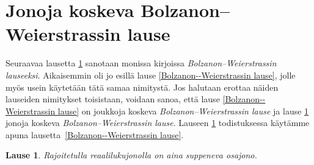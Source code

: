 \documentclass[a4paper,12pt,leqno,oneside]{report} %
\theoremstyle{plain}
\newtheorem{lause}{Lause}[chapter]
\theoremstyle{definition}
\theoremstyle{remark}
\numberwithin{equation}{chapter}
\begin{document}
\section{Jonoja koskeva Bolzanon--Weierstrassin lause}%
\label{sec: Jonoja koskeva BW:n lause}

Seuraavaa lausetta \ref{jonoja koskeva BW:n lause} sanotaan monissa kirjoissa \emph{Bolzanon--Weierstrassin lau\-seeksi}. Aikaisemmin oli jo esillä lause \ref{Bolzanon--Weierstrassin lause}, jolle myös usein käytetään tätä samaa nimitystä. Jos halutaan erottaa näiden lauseiden nimitykset toisistaan, voidaan sanoa, että lause \ref{Bolzanon--Weierstrassin lause} on joukkoja koskeva \emph{Bolzanon--Weierstras\-sin lause} ja lause \ref{jonoja koskeva BW:n lause} jonoja koskeva \emph{Bolzanon--Weierstrassin lause}. Lauseen \ref{jonoja koskeva BW:n lause} todistuksessa käytämme apuna lausetta~\ref{Bolzanon--Weierstrassin lause}.

\begin{lause}\label{jonoja koskeva BW:n lause}
Rajoitetulla reaalilukujonolla on aina suppeneva osajono.
\end{lause}
\end{document}
